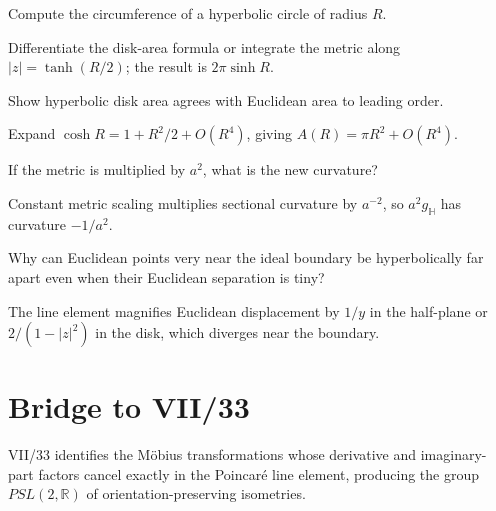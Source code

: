 \begin{problem}\label{prob:vii32-ch02}
Compute the circumference of a hyperbolic circle of radius \(R\).
\end{problem}
\begin{solution}
Differentiate the disk-area formula or integrate the metric along \(|z|=\tanh(R/2)\); the result is \(2\pi\sinh R\).
\end{solution}

\begin{problem}\label{prob:vii32-ch03}
Show hyperbolic disk area agrees with Euclidean area to leading order.
\end{problem}
\begin{solution}
Expand \(\cosh R=1+R^2/2+O(R^4)\), giving \(A(R)=\pi R^2+O(R^4)\).
\end{solution}

\begin{problem}\label{prob:vii32-ch04}
If the metric is multiplied by \(a^2\), what is the new curvature?
\end{problem}
\begin{solution}
Constant metric scaling multiplies sectional curvature by \(a^{-2}\), so \(a^2g_{\mathbb H}\) has curvature \(-1/a^2\).
\end{solution}

\begin{problem}\label{prob:vii32-ch05}
Why can Euclidean points very near the ideal boundary be hyperbolically far apart even when their Euclidean separation is tiny?
\end{problem}
\begin{solution}
The line element magnifies Euclidean displacement by \(1/y\) in the half-plane or \(2/(1-|z|^2)\) in the disk, which diverges near the boundary.
\end{solution}

\section*{Bridge to VII/33}
VII/33 identifies the Möbius transformations whose derivative and imaginary-part factors cancel exactly in the Poincaré line element, producing the group \(PSL(2,\mathbb R)\) of orientation-preserving isometries.
